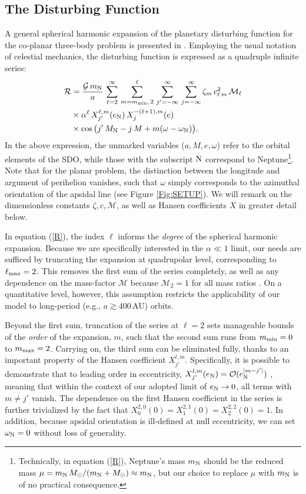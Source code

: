 \documentclass[twocolumn]{aastex62}
\newcommand{\G}{\mathcal{G}}
\newcommand{\Msun}{M_{\odot}}
\newcommand{\R}{\mathcal{R}}
\newcommand{\mn}{m_{\rm{N}}}
\newcommand{\en}{e_{\rm{N}}}
\newcommand{\Mn}{M_{\rm{N}}}
\newcommand{\order}{\mathcal{O}}
\begin{document}
\subsection{The Disturbing Function}
A general spherical harmonic expansion of the planetary disturbing function for the co-planar three-body problem is presented in \citet{2013MNRAS.435.2187M}. Employing the usual notation of celestial mechanics, the disturbing function is expressed as a quadruple infinite series:
\begin{align}
\R&=\frac{\G\,\mn}{a}\, \sum_{\ell=2}^{\infty} \, \sum_{m=m_{\rm{min}},\,2}^{\ell} \, \sum_{j' = -\infty}^{\infty} \, \sum_{j = -\infty}^{\infty} \zeta_m\, c_{\ell\,m}^2\,\mathcal{M}_\ell \nonumber \\
&\times \alpha^\ell\, X_{j'}^{\ell,m} (\en) \,X_{j}^{-(\ell+1),m} (e)\, \nonumber \\
&\times \cos\big(j'\,\Mn -j\,M+m(\omega-\omega_{\rm{N}})\big).
\label{R}
\end{align}
In the above expression, the unmarked variables ($a,M,e,\omega$) refer to the orbital elements of the SDO, while those with the subscript $\rm{N}$ correspond to Neptune\footnote{Technically, in equation (\ref{R}), Neptune's mass $\mn$ should be the reduced mass $\mu=\mn\,\Msun/(\mn+\Msun)\approx\mn$, but our choice to replace $\mu$ with $\mn$ is of no practical consequence.}. Note that for the planar problem, the distinction between the longitude and argument of perihelion vanishes, such that $\omega$ simply corresponds to the azimuthal orientation of the apsidal line (see Figure \ref{Fig:SETUP}). We will remark on the dimensionless constants $\zeta, c, \mathcal{M}$, as well as Hansen coefficients $X$ in greater detail below.

In equation (\ref{R}), the index $\ell$ informs the \textit{degree} of the spherical harmonic expansion. Because we are specifically interested in the $\alpha\ll1$ limit, our needs are sufficed by truncating the expansion at quadrupolar level, corresponding to $\ell_{\rm{max}}=2$. This removes the first sum of the series completely, as well as any dependence on the mass-factor $\mathcal{M}$ because $\mathcal{M}_2=1$ for all mass ratios \citep{2013MNRAS.435.2187M}. On a quantitative level, however, this assumption restricts the applicability of our model to long-period (e.g., $a\gtrsim400\,$AU) orbits.

Beyond the first sum, truncation of the series at $\ell=2$ sets manageable bounds of the \textit{order} of the expansion, $m$, such that the second sum runs from $m_{\rm{min}}=0$ to $m_{\rm{max}}=2$. Carrying on, the third sum can be eliminated fully, thanks to an important property of the Hansen coefficient $X_{j'}^{l,m}$. Specifically, it is possible to demonstrate that to leading order in eccentricity, $X_{j'}^{l,m}(\en)=\order(\en^{|m-j'|})$ \citep{1981CeMec..25..101H}, meaning that within the context of our adopted limit of $\en\rightarrow0$, all terms with $m\ne j'$ vanish. The dependence on the first Hansen coefficient in the series is further trivialized by the fact that $X_0^{2,0}(0) = X_1^{2,1}(0) = X_2^{2,2}(0) = 1$. In addition, because apsidal orientation is ill-defined at null eccentricity, we can set $\omega_{\rm{N}}=0$ without loss of generality.
\end{document}
